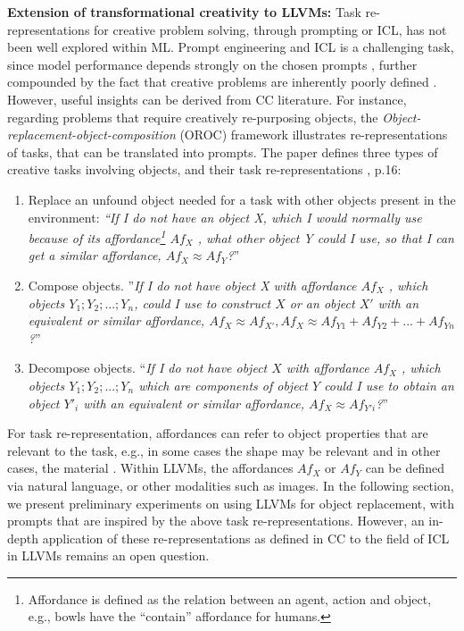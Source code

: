 \textbf{Extension of transformational creativity to LLVMs:} Task re-representations for creative problem solving, through prompting or ICL, has not been well explored within ML. Prompt engineering and ICL is a challenging task, since model performance depends strongly on the chosen prompts \cite{rubin2021learning}, further compounded by the fact that creative problems are inherently poorly defined \cite{olteteanu2014two}. However, useful insights can be derived from CC literature. For instance, regarding problems that require creatively re-purposing objects, the \textit{Object-replacement-object-composition} (OROC) framework \cite{oltecteanu2016object} illustrates re-representations of tasks, that can be translated into prompts. The paper defines three types of creative tasks involving objects, and their task re-representations \cite{oltecteanu2016object}, p.16:
\begin{enumerate}
    \item Replace an unfound object needed for a task with other objects present in the environment: \textit{``If I do not have an object X, which I would normally use because of its affordance\footnote{Affordance is defined as the relation between an agent, action and object, e.g., bowls have the ``contain'' affordance for humans.} $Af_X$ , what other object Y could I use, so that I can get a similar affordance, $Af_X \approx Af_Y$?}''
    \item Compose objects. ''\textit{If I do not have object X with affordance $Af_X$ , which objects $Y_1; Y_2; ... ; Y_n$, could I use to construct $X$ or an object $X'$ with an equivalent or similar affordance, $Af_X \approx Af_{X'}, Af_X \approx Af_{Y1} + Af_{Y2} + ... + Af_{Yn}$?}''
    \item Decompose objects. ``\textit{If I do not have object $X$ with affordance $Af_X$ , which objects $Y_1; Y_2; ... ; Y_n$ which are components of object $Y$ could I use to obtain an object $Y'_i$ with an equivalent or similar affordance, $Af_X \approx Af_{Y'i}$?}''
\end{enumerate}
For task re-representation, affordances can refer to object properties that are relevant to the task, e.g., in some cases the shape may be relevant and in other cases, the material \cite{oltecteanu2016object}. Within LLVMs, the affordances $Af_X$ or $Af_Y$ can be defined via natural language, or other modalities such as images. In the following section, we present preliminary experiments on using LLVMs for object replacement, with prompts that are inspired by the above task re-representations. However, an in-depth application of these re-representations as defined in CC to the field of ICL in LLVMs remains an open question.



